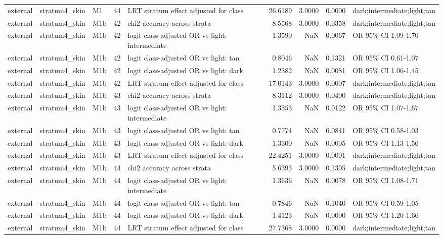 \begin{tabular}{lllrlrrrl}
external & stratum4\_skin & M1 & 44 & LRT stratum effect adjusted for class & 26.6189 & 3.0000 & 0.0000 & dark;intermediate;light;tan \\
external & stratum4\_skin & M1b & 42 & chi2 accuracy across strata & 8.5568 & 3.0000 & 0.0358 & dark;intermediate;light;tan \\
external & stratum4\_skin & M1b & 42 & logit class-adjusted OR vs light: intermediate & 1.3590 & NaN & 0.0067 & OR 95\% CI 1.09-1.70 \\
external & stratum4\_skin & M1b & 42 & logit class-adjusted OR vs light: tan & 0.8046 & NaN & 0.1321 & OR 95\% CI 0.61-1.07 \\
external & stratum4\_skin & M1b & 42 & logit class-adjusted OR vs light: dark & 1.2382 & NaN & 0.0081 & OR 95\% CI 1.06-1.45 \\
external & stratum4\_skin & M1b & 42 & LRT stratum effect adjusted for class & 17.0143 & 3.0000 & 0.0007 & dark;intermediate;light;tan \\
external & stratum4\_skin & M1b & 43 & chi2 accuracy across strata & 8.3112 & 3.0000 & 0.0400 & dark;intermediate;light;tan \\
external & stratum4\_skin & M1b & 43 & logit class-adjusted OR vs light: intermediate & 1.3353 & NaN & 0.0122 & OR 95\% CI 1.07-1.67 \\
external & stratum4\_skin & M1b & 43 & logit class-adjusted OR vs light: tan & 0.7774 & NaN & 0.0841 & OR 95\% CI 0.58-1.03 \\
external & stratum4\_skin & M1b & 43 & logit class-adjusted OR vs light: dark & 1.3300 & NaN & 0.0005 & OR 95\% CI 1.13-1.56 \\
external & stratum4\_skin & M1b & 43 & LRT stratum effect adjusted for class & 22.4251 & 3.0000 & 0.0001 & dark;intermediate;light;tan \\
external & stratum4\_skin & M1b & 44 & chi2 accuracy across strata & 5.6393 & 3.0000 & 0.1305 & dark;intermediate;light;tan \\
external & stratum4\_skin & M1b & 44 & logit class-adjusted OR vs light: intermediate & 1.3636 & NaN & 0.0078 & OR 95\% CI 1.08-1.71 \\
external & stratum4\_skin & M1b & 44 & logit class-adjusted OR vs light: tan & 0.7846 & NaN & 0.1040 & OR 95\% CI 0.59-1.05 \\
external & stratum4\_skin & M1b & 44 & logit class-adjusted OR vs light: dark & 1.4123 & NaN & 0.0000 & OR 95\% CI 1.20-1.66 \\
external & stratum4\_skin & M1b & 44 & LRT stratum effect adjusted for class & 27.7368 & 3.0000 & 0.0000 & dark;intermediate;light;tan \\

\end{tabular}
